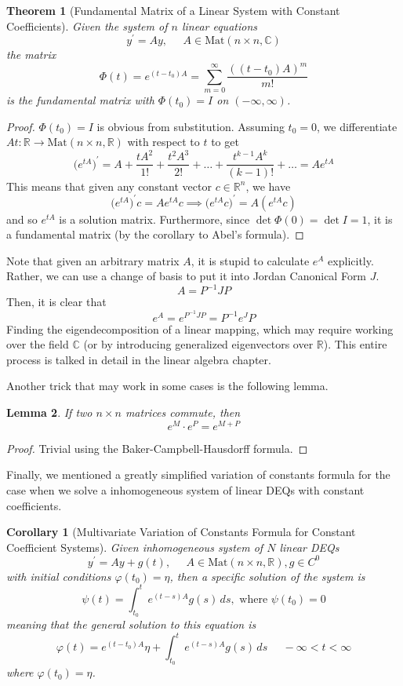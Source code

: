 \documentclass{article}
\newtheorem{theorem}{Theorem}[section]
\newtheorem{lemma}[theorem]{Lemma}
\newtheorem{corollary}{Corollary}[theorem]
\theoremstyle{remark}
\theoremstyle{definition}
\begin{document}
    \begin{theorem}[Fundamental Matrix of a Linear System with Constant Coefficients]
    Given the system of $n$ linear equations 
    \[y^\prime = A y, \;\;\;\;\; A \in \text{Mat}(n \times n, \mathbb{C})\]
    the matrix
    \[\Phi(t) = e^{(t-t_0)A} = \sum_{m=0}^\infty \frac{((t-t_0)A)^m}{m!}\]
    is the fundamental matrix with $\Phi(t_0) = I$ on $(-\infty, \infty)$. 
    \end{theorem}
    \begin{proof}
    $\Phi(t_0) = I$ is obvious from substitution. Assuming $t_0 = 0$, we differentiate $At: \mathbb{R} \longrightarrow \text{Mat}(n \times n, \mathbb{R})$ with respect to $t$ to get
    \[\big( e^{tA} \big)^\prime = A + \frac{tA^2} {1!} + \frac{t^2 A^3}{2!} + \ldots + \frac{t^{k-1} A^{k}}{(k-1)!} + \ldots = A e^{tA}\]
    This means that given any constant vector $c \in \mathbb{R}^n$, we have
    \[\big( e^{tA} \big)^\prime c = A e^{tA} c \implies \big( e^{tA} c\big)^\prime = A (e^{tA} c)\]
    and so $e^{tA}$ is a solution matrix. Furthermore, since $\det{ \Phi(0)} = \det{I} = 1$, it is a fundamental matrix (by the corollary to Abel's formula). 
    \end{proof}

    Note that given an arbitrary matrix $A$, it is stupid to calculate $e^{A}$ explicitly. Rather, we can use a change of basis to put it into Jordan Canonical Form $J$. 
    \[A = P^{-1} J P\]
    Then, it is clear that
    \[e^A = e^{P^{-1} J P} = P^{-1} e^J P\]
    Finding the eigendecomposition of a linear mapping, which may require working over the field $\mathbb{C}$ (or by introducing generalized eigenvectors over $\mathbb{R}$). This entire process is talked in detail in the linear algebra chapter. 

    Another trick that may work in some cases is the following lemma. 

    \begin{lemma}
    If two $n \times n$ matrices commute, then
    \[e^{M} \cdot e^{P} = e^{M + P} \]
    \end{lemma}
    \begin{proof}
    Trivial using the Baker-Campbell-Hausdorff formula. 
    \end{proof}

    Finally, we mentioned a greatly simplified variation of constants formula for the case when we solve a inhomogeneous system of linear DEQs with constant coefficients. 

    \begin{corollary}[Multivariate Variation of Constants Formula for Constant Coefficient Systems]
    Given inhomogeneous system of $N$ linear DEQs 
    \[y^\prime = A y + g(t), \;\;\;\;\; A \in \text{Mat}(n \times n, \mathbb{R}), g \in C^0\]
    with initial conditions $\varphi(t_0) = \eta$, then a specific solution of the system is 
    \[\psi (t) = \int_{t_0}^t e^{(t-s)A} g(s) \,ds , \text{ where } \psi(t_0) = 0\]
    meaning that the general solution to this equation is 
    \[\varphi(t) = e^{(t - t_0)A} \eta + \int_{t_0}^t e^{(t-s)A} g(s) \,ds \;\;\;\;\; -\infty < t< \infty\]
    where $\varphi(t_0) = \eta$. 
    \end{corollary}
\end{document}
